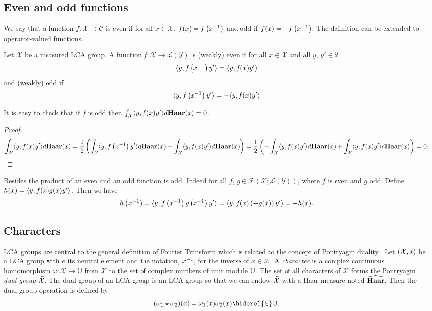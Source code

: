 \subsection{Even and odd functions}
We say that a function $f:\mathcal{X}\to\mathcal{C}$ is even if for all $x\in\mathcal{X}$, $f(x)=f\left({x}^{-1}\right)$ and odd if $f(x)=-f\left({x}^{-1}\right)$. The definition can be extended to operator-valued functions.
\begin{definition}
Let $\mathcal{X}$ be a measured LCA group. A function $f:\mathcal{X}\to\mathcal{L}(\mathcal{Y})$ is (weakly) even if for all $x\in\mathcal{X}$ and all $y$, $y'\in\mathcal{Y}$
\begin{dmath}
\inner{y,f\left(\inv{x}\right)y'}=\inner{y,f(x)y'}
\end{dmath}
and (weakly) odd if
\begin{dmath}
\inner{y,f\left(\inv{x}\right)y'}=-\inner{y,f(x)y'}
\end{dmath}
\end{definition}
It is easy to check that if $f$ is odd then $\int_{\mathcal{X}}\langle y,f(x)y'\rangle d\mathbf{Haar}(x)=0$.
\begin{proof}
\begin{dmath*}
\int_{\mathcal{X}}\inner{y,f(x)y'}d\Haar(x)=\frac{1}{2}\left(\int_{\mathcal{X}}\inner{y,f\left(\inv{x}\right)y'}d\Haar(x) + \int_{\mathcal{X}}\inner{y,f(x)y'}d\Haar(x)\right)
=\frac{1}{2}\left(-\int_{\mathcal{X}}\inner{y,f(x)y'}d\Haar(x) + \int_{\mathcal{X}}\inner{y,f(x)y'}d\Haar(x)\right)
=0.
\end{dmath*}
\end{proof}
Besides the product of an even and an odd function is odd. Indeed for all $f$, $g\in\mathcal{F}(\mathcal{X};\mathcal{L}(\mathcal{Y}))$, where $f$ is even and $g$ odd. Define $h(x)=\langle y,f(x)g(x)y'\rangle$. Then we have
\begin{dmath}
h\left(\inv{x}\right)
=\inner{y,f\left(\inv{x}\right)g\left(\inv{x}\right)y'}
=\inner{y,f(x)\left(-g(x)\right)y'}
=-h(x).
\end{dmath}
\subsection{Characters}
\label{subsec:character}
\acf{LCA} groups are central to the general definition of Fourier Transform which is related to the concept of Pontryagin duality \citep{folland1994course}.
Let $(\mathcal{X}, \star)$ be a \acs{LCA} group with $e$ its neutral element and the notation, ${x}^{-1}$, for the inverse of $x \in \mathcal{X}$. A \emph{character} is a complex continuous homomorphism $\omega:\mathcal{X}\to\mathbb{U}$ from $\mathcal{X}$ to the set of complex numbers of unit module $\mathbb{U}$. The set of all characters of $\mathcal{X}$ forms the Pontryagin \emph{dual  group} $\widehat{\mathcal{X}}$. The dual group of an \acs{LCA} group is an \acs{LCA} group so that we can endow $\widehat{\mathcal{X}}$ with a  Haar measure noted $\widehat{\mathbf{Haar}}$. Then the dual group operation is defined by
\begin{dmath*}
(\omega_1 \groupop \omega_2)(x)=\omega_1(x)\omega_2(x) \hiderel{\in} \mathbb{U}.
\end{dmath*}
